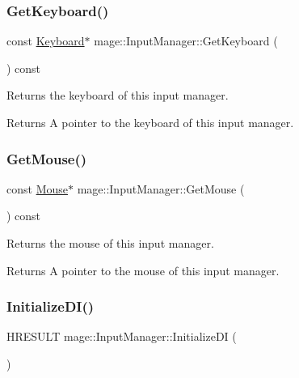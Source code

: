 \subsubsection{\texorpdfstring{Get\+Keyboard()}{GetKeyboard()}}
{\footnotesize\ttfamily const \hyperlink{classmage_1_1_keyboard}{Keyboard}$\ast$ mage\+::\+Input\+Manager\+::\+Get\+Keyboard (\begin{DoxyParamCaption}{ }\end{DoxyParamCaption}) const}

Returns the keyboard of this input manager.

\begin{DoxyReturn}{Returns}
A pointer to the keyboard of this input manager. 
\end{DoxyReturn}
\hypertarget{classmage_1_1_input_manager_ad268916e07f44e40bf267efa0e673186}{}\label{classmage_1_1_input_manager_ad268916e07f44e40bf267efa0e673186} 
\subsubsection{\texorpdfstring{Get\+Mouse()}{GetMouse()}}
{\footnotesize\ttfamily const \hyperlink{classmage_1_1_mouse}{Mouse}$\ast$ mage\+::\+Input\+Manager\+::\+Get\+Mouse (\begin{DoxyParamCaption}{ }\end{DoxyParamCaption}) const}

Returns the mouse of this input manager.

\begin{DoxyReturn}{Returns}
A pointer to the mouse of this input manager. 
\end{DoxyReturn}
\hypertarget{classmage_1_1_input_manager_af3ca0717e37916463cc4f40c7d174b33}{}\label{classmage_1_1_input_manager_af3ca0717e37916463cc4f40c7d174b33} 
\subsubsection{\texorpdfstring{Initialize\+D\+I()}{InitializeDI()}}
{\footnotesize\ttfamily H\+R\+E\+S\+U\+LT mage\+::\+Input\+Manager\+::\+Initialize\+DI (\begin{DoxyParamCaption}{ }\end{DoxyParamCaption})\hspace{0.3cm}{\ttfamily [private]}}

